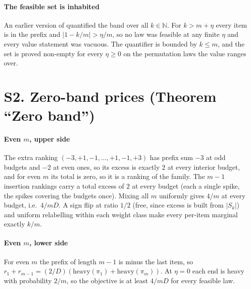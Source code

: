 
\paragraph{The feasible set is inhabited} An earlier version of 
quantified the band over all $k\in\mathbb{N}$. For $k>m+\eta$ every item is in the
prefix and $|1-k/m|>\eta/m$, so no law was feasible at any finite $\eta$ and every value
statement was vacuous. The quantifier
is bounded by $k\le m$, and the set is proved non-empty for every $\eta\ge0$ on the
permutation laws the value ranges over.


\section{S2. Zero-band prices (Theorem ``Zero band'')}

\paragraph{Even $m$, upper side} The extra ranking $(-3,+1,-1,\dots,+1,-1,+3)$ has prefix
sum $-3$ at odd budgets and $-2$ at even ones, so its excess is exactly $2$ at every
interior budget, and for even $m$ its total is zero, so it is a ranking of the family. The
$m-1$ insertion rankings carry a total excess of $2$ at every budget (each a single spike,
the spikes covering the budgets once). Mixing all $m$ uniformly gives $4/m$ at every
budget, i.e.\ $4/mD$. A sign flip at ratio $1/2$ (free, since excess is built from
$|S_{k}|$) and uniform relabelling within each weight class make every per-item marginal
exactly $k/m$.


\paragraph{Even $m$, lower side} For even $m$ the prefix of length $m-1$ is minus the last
item, so $r_{1}+r_{m-1}=(2/D)(\mathrm{heavy}(\pi_{1})+\mathrm{heavy}(\pi_{m}))$. At $\eta=0$
each end is heavy with probability $2/m$, so the objective is at least $4/mD$ for every
feasible law.

